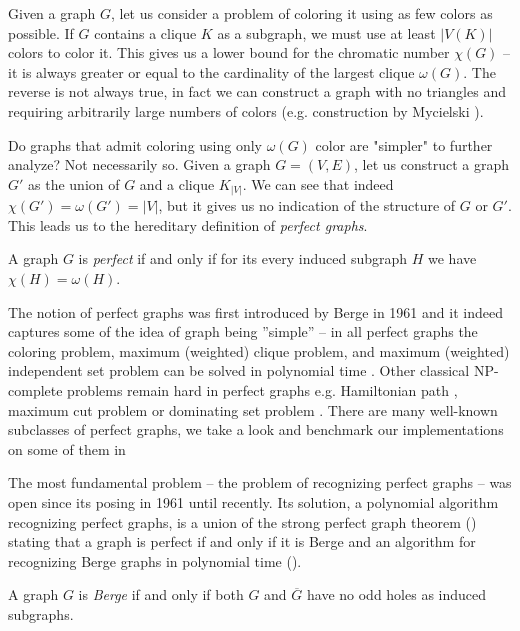 Given a graph $G$, let us consider a problem of coloring it using as few colors as possible. If $G$ contains a clique $K$ as a subgraph, we must use at least $|V(K)|$ colors to color it. This gives us a lower bound for the chromatic number $\chi(G)$ -- it is always greater or equal to the cardinality of the largest clique $\omega(G)$. The reverse is not always true, in fact we can construct a graph with no triangles and requiring arbitrarily large numbers of colors (e.g. construction by Mycielski \cite{Mycielski1955}).

Do graphs that admit coloring using only $\omega(G)$ color are "simpler" to further analyze? Not necessarily so. Given a graph $G = (V, E)$, let us construct a graph $G'$ as the union of $G$ and a clique $K_{|V|}$. We can see that indeed $\chi(G') = \omega(G') = |V|$, but it gives us no indication of the structure of $G$ or $G'$. This leads us to the hereditary definition of \emph{perfect graphs}.

\begin{defn}
	\label{def:perfectGraph}
	A graph $G$ is \emph{perfect} if and only if for its every induced subgraph $H$ we have $\chi(H) = \omega(H)$.
\end{defn}

The notion of perfect graphs was first introduced by Berge in 1961 \cite{CB61} and it indeed captures some of the idea of graph being ''simple'' -- in all perfect graphs the coloring problem, maximum (weighted) clique problem, and maximum (weighted) independent set problem can be solved in polynomial time \cite{grotschel1993}. Other classical NP-complete problems remain hard in perfect graphs e.g. Hamiltonian path \cite{Mller1996}, maximum cut problem \cite{Bodlaender1994} or dominating set problem \cite{Dewdney81}. There are many well-known subclasses of perfect graphs, we take a look and benchmark our implementations on some of them in 

The most fundamental problem -- the problem of recognizing perfect graphs -- was open since its posing in 1961 until recently. Its solution, a polynomial algorithm recognizing perfect graphs, is a union of the strong perfect graph theorem () stating that a graph is perfect if and only if it is Berge and an algorithm for recognizing Berge graphs in polynomial time ().

\begin{defn}
	\label{def:bergeGraph}
	A graph $G$ is \emph{Berge} if and only if both $G$ and $\overline{G}$ have no odd holes as induced subgraphs.
\end{defn}

